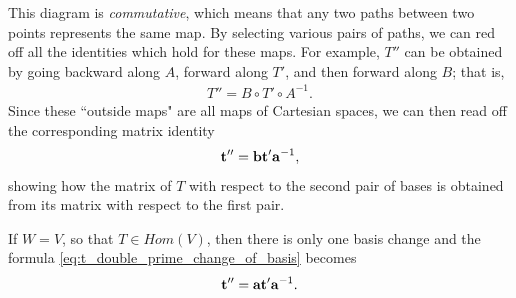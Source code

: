 \documentclass[12pt,letterpaper,reqno]{article}
\numberwithin{equation}{section}
\newcommand{\ti}[1]{\textit{#1}}
\begin{document}
This diagram is \ti{commutative}, which means that any two paths between two points represents the same map. By selecting various pairs of paths, we can red off all the identities which hold for these maps. For example, $T''$ can be obtained by going backward along $A$, forward along $T'$, and then forward along $B$; that is,
\begin{align*}
	T''=B \circ T' \circ A^{-1}.
\end{align*}
Since these ``outside maps" are all maps of Cartesian spaces, we can then read off the corresponding matrix identity
\begin{equation}\label{eq:t_double_prime_change_of_basis}
	{\bf t}''={\bf b}{\bf t}'{\bf a}^{-1},
\end{equation}
showing how the matrix of $T$ with respect to the second pair of bases is obtained from its matrix with respect to the first pair.

If $W=V$, so that $T \in Hom(V)$, then there is only one basis change and the formula \eqref{eq:t_double_prime_change_of_basis} becomes
\begin{equation}
	{\bf t}''={\bf a}{\bf t}'{\bf a}^{-1}.
\end{equation}
\end{document}
